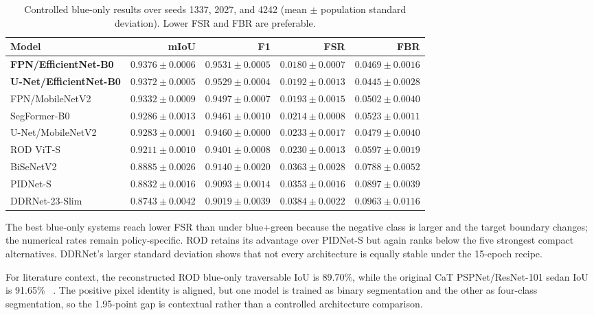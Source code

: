 \begin{table}[H]
\centering
\caption{Controlled blue-only results over seeds 1337, 2027, and 4242
(mean $\pm$ population standard deviation). Lower FSR and FBR are preferable.}
\label{tab:wider_blue_only}
\footnotesize
\setlength{\tabcolsep}{4pt}
\begin{tabular}{@{}lrrrr@{}}
\toprule
\textbf{Model} & \textbf{mIoU} & \textbf{F1} & \textbf{FSR} & \textbf{FBR} \\
\midrule
\textbf{FPN/EfficientNet-B0} & $\mathbf{0.9376\pm0.0006}$ & $\mathbf{0.9531\pm0.0005}$ & $\mathbf{0.0180\pm0.0007}$ & $0.0469\pm0.0016$ \\
\textbf{U-Net/EfficientNet-B0} & $\mathbf{0.9372\pm0.0005}$ & $\mathbf{0.9529\pm0.0004}$ & $0.0192\pm0.0013$ & $\mathbf{0.0445\pm0.0028}$ \\
FPN/MobileNetV2 & $0.9332\pm0.0009$ & $0.9497\pm0.0007$ & $0.0193\pm0.0015$ & $0.0502\pm0.0040$ \\
SegFormer-B0 & $0.9286\pm0.0013$ & $0.9461\pm0.0010$ & $0.0214\pm0.0008$ & $0.0523\pm0.0011$ \\
U-Net/MobileNetV2 & $0.9283\pm0.0001$ & $0.9460\pm0.0000$ & $0.0233\pm0.0017$ & $0.0479\pm0.0040$ \\
ROD ViT-S & $0.9211\pm0.0010$ & $0.9401\pm0.0008$ & $0.0230\pm0.0013$ & $0.0597\pm0.0019$ \\
BiSeNetV2 & $0.8885\pm0.0026$ & $0.9140\pm0.0020$ & $0.0363\pm0.0028$ & $0.0788\pm0.0052$ \\
PIDNet-S & $0.8832\pm0.0016$ & $0.9093\pm0.0014$ & $0.0353\pm0.0016$ & $0.0897\pm0.0039$ \\
DDRNet-23-Slim & $0.8743\pm0.0042$ & $0.9019\pm0.0039$ & $0.0384\pm0.0022$ & $0.0963\pm0.0116$ \\
\bottomrule
\end{tabular}
\end{table}

The best blue-only systems reach lower FSR than under blue+green because the
negative class is larger and the target boundary changes; the numerical rates
remain policy-specific. ROD retains its advantage over PIDNet-S but again ranks
below the five strongest compact alternatives. DDRNet's larger standard
deviation shows that not every architecture is equally stable under the
15-epoch recipe.

For literature context, the reconstructed ROD blue-only traversable IoU is
89.70\%, while the original CaT PSPNet/ResNet-101 sedan IoU is 91.65\%
~\cite{sharma2022cat}. The positive pixel identity is aligned, but one model is
trained as binary segmentation and the other as four-class segmentation, so
the 1.95-point gap is contextual rather than a controlled architecture
comparison.

